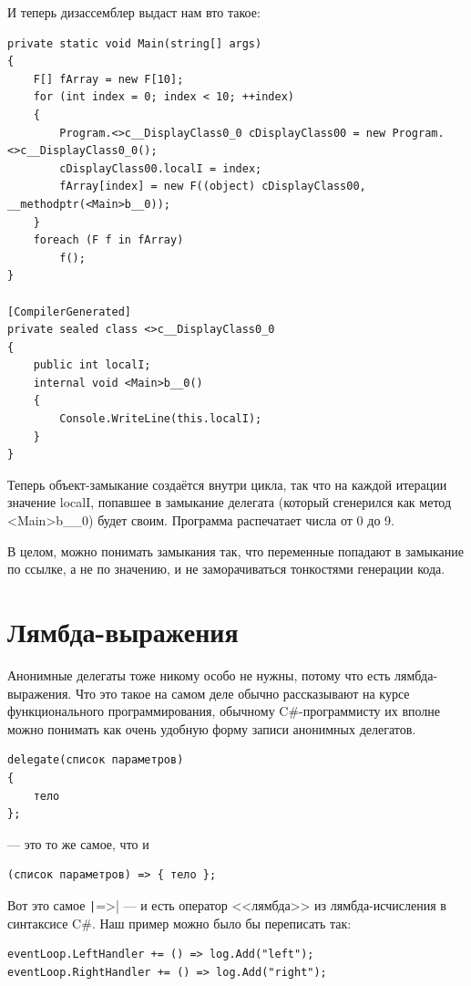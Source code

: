 \documentclass[a5paper]{article}
\begin{document}
И теперь дизассемблер выдаст нам вто такое:

\begin{verbatim}
private static void Main(string[] args)
{
    F[] fArray = new F[10];
    for (int index = 0; index < 10; ++index)
    {
        Program.<>c__DisplayClass0_0 cDisplayClass00 = new Program.<>c__DisplayClass0_0();
        cDisplayClass00.localI = index;
        fArray[index] = new F((object) cDisplayClass00, __methodptr(<Main>b__0));
    }
    foreach (F f in fArray)
        f();
}

[CompilerGenerated]
private sealed class <>c__DisplayClass0_0
{
    public int localI;
    internal void <Main>b__0()
    {
        Console.WriteLine(this.localI);
    }
}
\end{verbatim}

Теперь объект-замыкание создаётся внутри цикла, так что на каждой итерации значение localI, попавшее в замыкание делегата (который сгенерился как метод <Main>b\_\_0) будет своим. Программа распечатает числа от 0 до 9. 

В целом, можно понимать замыкания так, что переменные попадают в замыкание по ссылке, а не по значению, и не заморачиваться тонкостями генерации кода.

\section{Лямбда-выражения}

Анонимные делегаты тоже никому особо не нужны, потому что есть лямбда-выражения. Что это такое на самом деле обычно рассказывают на курсе функционального программирования, обычному C\#-программисту их вполне можно понимать как очень удобную форму записи анонимных делегатов.

\begin{verbatim}
delegate(список параметров)
{
    тело
};
\end{verbatim}

--- это то же самое, что и 
\begin{verbatim}
(список параметров) => { тело };
\end{verbatim}

Вот это самое \texttt|=>| --- и есть оператор <<лямбда>> из лямбда-исчисления в синтаксисе C\#. Наш пример можно было бы переписать так:

\begin{verbatim}
eventLoop.LeftHandler += () => log.Add("left");
eventLoop.RightHandler += () => log.Add("right");
\end{verbatim}
\end{document}
